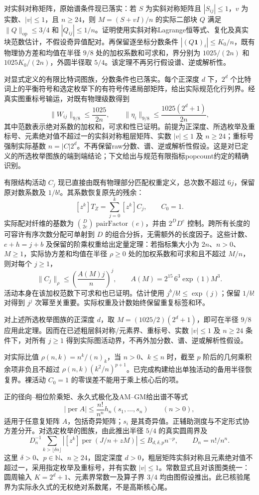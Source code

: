 \documentclass[UTF8,11pt,fontset=fandol]{ctexart}
\begin{document}
对实斜对称矩阵，原始谱条件现已落实：若 $S$ 为实斜对称矩阵且 $|S_{ij}|\le1$，$v$ 为实数、$|v|\le1$，且 $n\ge24$，则 $M=(S+vI)/n$ 的实际二部块 $Q$ 满足 $\|Q\|_{\mathrm{op}}\le3/4$ 和 $|Q_{ij}|\le1/n$。证明使用实斜对称Lagrange恒等式、复化及真实块范数估计，不假设奇异值配对。再保留逐坐标分数条件 $|(Q\mathbf1)_i|\le K_0/n$，既有物理协方差和均值在半径 $9/8$ 处的加权系数和可求和，界分别为 $1025/(2n)$ 和 $1025K_0/(2n)$，外圆半径取 $5/4$。该定理不再另行假设谱、逆或解析性。

对显式定义的有限比特词图族，分数条件也已落实。每个正深度 $d$ 下，$2^d$ 个比特词上的平衡符号和选定枚举下的有符号传递局部矩阵，给出实际规范化行列界。经真实图重标号输运，对既有物理级数得到
\[
 \|W_{ij}\|_{9/8}\le\frac{1025}{2n},\qquad
 \|\eta_i\|_{9/8}\le\frac{1025(2^d+1)}{2n},
\]
其中范数表示绝对系数的加权和，可求和性已证明。前提为正深度、所选枚举及重标号、元素绝对值不超过一的实斜对称粗层矩阵、实数 $|v|\le1$ 及 $n\ge24$；重标号强制实际基数 $n=|C|2^d$。不再保留raw分数、谱、逆或解析性假设。这是对已定义的所选枚举图族的端到端结论；下文给出与规范有限指标popcount约定的精确识别。

有限结构活动 $C_j$ 现已直接由既有物理部分匹配权重定义，总次数不超过 $6j$，保留原对数系数及 $1/b!$。其系数恢复原先的残余：
\[
 [z^k]T_Z=\sum_{j=0}^{k}[z^k]C_j,\qquad C_0=1.
\]
实际配对纤维的基数为 $\binom{D}{2e}\operatorname{pairFactor}(e)$，并由 $2^D D^e$ 控制。跨所有长度的可容许有序次数分配可单射到 $D$ 的组合分拆，无需额外的长度因子。这些计数、$e+h=j+b$ 及保留的阶乘权重给出定量定理：若指标集大小为 $2n$、$n>0$、$M\ge1$，实际协方差和均值在半径 $\rho\ge0$ 处的加权系数和可求和且不超过 $M/n$，则对每个 $j\ge1$，
\[
 \|C_j\|_\rho\le\left(\frac{A(M)j}{n}\right)^j,
 \qquad A(M)=2^{15}\,6^3\exp(1)M^3.
\]
活动本身在该加权范数下可求和也已证明。估计使用 $j^b/b!\le\exp(j)$；保留 $1/b!$ 对得到 $j^j$ 次幂至关重要。实际权重及计数始终保留重复标签和环。

对上述所选枚举图族的正深度 $d$，取 $M=(1025/2)(2^d+1)$，即可在半径 $9/8$ 应用此定理。因而在已述粗层斜对称/元素界、重标号、实数 $|v|\le1$ 及 $n\ge24$ 条件下，对所有 $j\ge1$ 得到实际图活动界，不再外加分数、谱、逆或解析性假设。

对实际比值 $\rho(n,k)=n^k/(n)_k$，当 $n>0$、$k\le n$ 时，截至 $p$ 阶后的几何乘积余项非负且不超过 $\rho(n,k)(k^2/n)^{p+1}$。已完成构建给出单独活动的备用半径恢复界。裸活动 $C_0=1$ 的零误差不能用于乘上核心后的项。

正的径向--相位阶乘矩、永久式极化及AM--GM给出谱不等式
\[
 |\operatorname{per}A|\le\frac{n!}{n^n}h_n(s_1,\ldots,s_n)\qquad(n>0),
\]
适用于任意复矩阵 $A$，包括奇异矩阵；$s_i$ 是其奇异值。正辅助测度与不定形式协方差分开。对选定枚举的图族，由此推出半径 $5/4$ 的真实圆周界及
\[
 D_n^{-1}\sum_{k>\lfloor\delta n\rfloor}
 |[z^k]\operatorname{per}(J/n+zM)|
 \le B_{d,\delta,p}n^{-p},\qquad D_n=n!/n^n.
\]
这里 $\delta>0$、$p\in\mathbb N$、$n\ge24$，固定深度 $d>0$，粗层矩阵实斜对称且元素绝对值不超过一，采用指定枚举及重标号，并有实数 $|v|\le1$。常数显式且对该图类统一：圆周输入 $K=2^d+1$、元素界常数一及算子界 $3/4$ 均由图假设推出。此已核验尾界为实际永久式的无权绝对系数尾，不是高斯核心尾。
\end{document}
